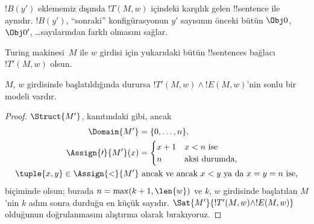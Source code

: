 \begin{enumerate}
$!B(y')$ eklememiz dışında $!T(M,w)$ içindeki karşılık gelen !!{sentence}
ile aynıdır. $!B(y')$, ``sonraki'' konfigürasyonun $y'$ sayısının önceki
bütün $\Obj 0$, $\Obj 0'$, \dots sayılarından farklı olmasını sağlar.
\end{enumerate}
Turing makinesi~$M$ ile $w$ girdisi için yukarıdaki bütün !!{sentence}s
bağlacı $!T'(M,w)$ olsun.

\begin{lem}
  $M$, $w$ girdisinde başlatıldığında durursa
  $!T'(M,w)\land !E(M,w)$'nin sonlu bir modeli vardır.
\end{lem}

\begin{proof}
  $\Struct{M'}$,  kanıtındaki gibi, ancak
  \begin{align*}
    \Domain{M'} & = \{0, \dots, n\},\\
    \Assign{\prime}{M'}(x) & = 
    \begin{cases}
      x + 1 &\text{$x < n$ ise}\\
      n &\text{aksi durumda,}
    \end{cases} \\
    \tuple{x,y} \in \Assign{<}{M'} &\text{ ancak ve ancak $x < y$ ya da $x = y = n$ ise,}
  \end{align*}
  biçiminde olsun; burada $n=\max(k+1,\len{w})$ ve $k$, $w$ girdisinde
  başlatılan $M$'nin $k$ adım sonra durduğu en küçük sayıdır.
  $\Sat{M'}{!T'(M,w)\land !E(M,w)}$ olduğunun doğrulanmasını alıştırma olarak
  bırakıyoruz.
\end{proof}


